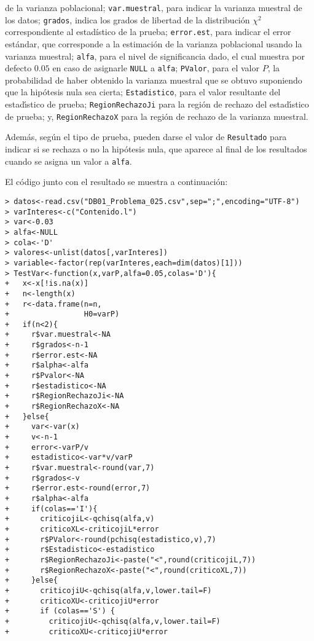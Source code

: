 \begin{solucion}
 de la varianza poblacional;
 \texttt{var.muestral}, para indicar la varianza muestral de los datos;
 \texttt{grados}, indica los grados de libertad de la distribuci\'on $\chi^2$
 correspondiente al estadístico de la prueba;
 \texttt{error.est}, para indicar el error est\'andar,
 que corresponde a la estimaci\'on de la varianza poblacional
 usando la varianza muestral;
 \texttt{alfa}, para el nivel de significancia dado,
 el cual muestra por defecto $0.05$
 en caso de asignarle \texttt{NULL} a \texttt{alfa};
 \texttt{PValor}, para el valor $P$, la probabilidad
 de haber obtenido la varianza muestral
 que se obtuvo suponiendo que la hip\'otesis nula sea cierta;
 \texttt{Estadistico}, para el valor resultante
 del estad\'{\i}stico de prueba;
 \texttt{RegionRechazoJi} para la regi\'on de rechazo del estad\'{\i}stico
 de prueba;
 y, \texttt{RegionRechazoX} para la regi\'on de rechazo de la varianza muestral.
 \par 
 Adem\'as, seg\'un el tipo de prueba, pueden darse el valor
 de \texttt{Resultado} para indicar si se rechaza o no
 la hip\'otesis nula, que aparece al final de los resultados
 cuando se asigna un valor a \texttt{alfa}.
 \par 
 El c\'odigo junto con el resultado se muestra a continuaci\'on:
 \begin{verbatim}
> datos<-read.csv("DB01_Problema_025.csv",sep=";",encoding="UTF-8")
> varInteres<-c("Contenido.l")
> var<-0.03
> alfa<-NULL
> cola<-'D'
> valores<-unlist(datos[,varInteres])
> variable<-factor(rep(varInteres,each=dim(datos)[1]))
> TestVar<-function(x,varP,alfa=0.05,colas='D'){
+   x<-x[!is.na(x)]
+   n<-length(x)
+   r<-data.frame(n=n,
+                 H0=varP)
+   if(n<2){
+     r$var.muestral<-NA
+     r$grados<-n-1
+     r$error.est<-NA
+     r$alpha<-alfa
+     r$Pvalor<-NA
+     r$estadistico<-NA
+     r$RegionRechazoJi<-NA
+     r$RegionRechazoX<-NA
+   }else{
+     var<-var(x)
+     v<-n-1
+     error<-varP/v
+     estadistico<-var*v/varP
+     r$var.muestral<-round(var,7)
+     r$grados<-v
+     r$error.est<-round(error,7)
+     r$alpha<-alfa
+     if(colas=='I'){
+       criticojiL<-qchisq(alfa,v)
+       criticoXL<-criticojiL*error
+       r$PValor<-round(pchisq(estadistico,v),7)
+       r$Estadistico<-estadistico
+       r$RegionRechazoJi<-paste("<",round(criticojiL,7))
+       r$RegionRechazoX<-paste("<",round(criticoXL,7))
+     }else{
+       criticojiU<-qchisq(alfa,v,lower.tail=F)
+       criticoXU<-criticojiU*error
+       if (colas=='S') {
+         criticojiU<-qchisq(alfa,v,lower.tail=F)
+         criticoXU<-criticojiU*error

\end{verbatim}
\end{solucion}

